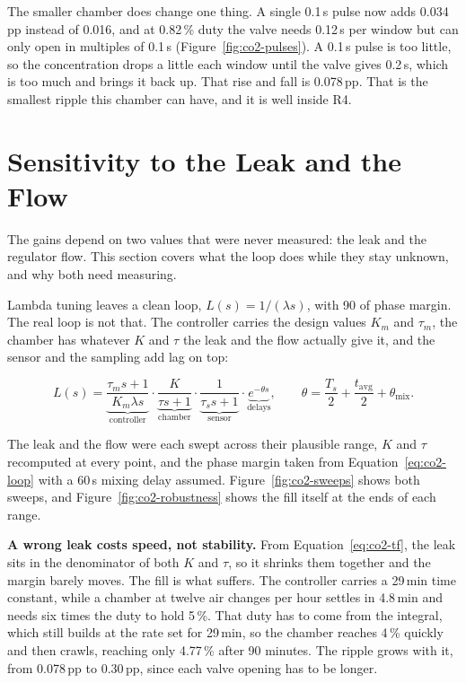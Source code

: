 The smaller chamber does change one thing. A single 0.1\,s pulse now adds 0.034\,pp instead of 0.016, and at 0.82\,\% duty the valve needs 0.12\,s per window but can only open in multiples of 0.1\,s (Figure~\ref{fig:co2-pulses}). A 0.1\,s pulse is too little, so the concentration drops a little each window until the valve gives 0.2\,s, which is too much and brings it back up. That rise and fall is 0.078\,pp. That is the smallest ripple this chamber can have, and it is well inside R4.

\section{Sensitivity to the Leak and the Flow}
\label{sec:co2-sensitivity}

The gains depend on two values that were never measured: the leak and the regulator flow. This section covers what the loop does while they stay unknown, and why both need measuring.

Lambda tuning leaves a clean loop, $L(s) = 1/(\lambda s)$, with 90\textdegree{} of phase margin. The real loop is not that. The controller carries the design values $K_m$ and $\tau_m$, the chamber has whatever $K$ and $\tau$ the leak and the flow actually give it, and the sensor and the sampling add lag on top:

\begin{equation}
L(s) = \underbrace{\frac{\tau_m s + 1}{K_m \lambda s}}_{\text{controller}} \cdot
       \underbrace{\frac{K}{\tau s + 1}}_{\text{chamber}} \cdot
       \underbrace{\frac{1}{\tau_s s + 1}}_{\text{sensor}} \cdot
       \underbrace{e^{-\theta s}}_{\text{delays}},
\qquad \theta = \frac{T_s}{2} + \frac{t_{\mathrm{avg}}}{2} + \theta_{\mathrm{mix}}.
\label{eq:co2-loop}
\end{equation}

The leak and the flow were each swept across their plausible range, $K$ and $\tau$ recomputed at every point, and the phase margin taken from Equation~\ref{eq:co2-loop} with a 60\,s mixing delay assumed. Figure~\ref{fig:co2-sweeps} shows both sweeps, and Figure~\ref{fig:co2-robustness} shows the fill itself at the ends of each range.

\textbf{A wrong leak costs speed, not stability.} From Equation~\ref{eq:co2-tf}, the leak sits in the denominator of both $K$ and $\tau$, so it shrinks them together and the margin barely moves. The fill is what suffers. The controller carries a 29\,min time constant, while a chamber at twelve air changes per hour settles in 4.8\,min and needs six times the duty to hold 5\,\%. That duty has to come from the integral, which still builds at the rate set for 29\,min, so the chamber reaches 4\,\% quickly and then crawls, reaching only 4.77\,\% after 90 minutes. The ripple grows with it, from 0.078\,pp to 0.30\,pp, since each valve opening has to be longer.

